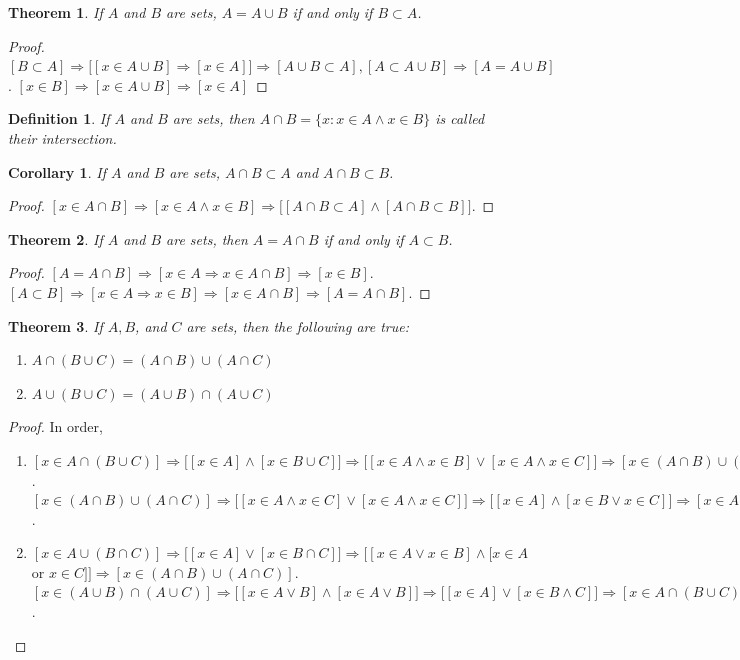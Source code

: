 \documentclass[oneside]{book}
\theoremstyle{mystyle}
\newtheorem{theorem}{Theorem}[section]
\newtheorem{definition}{Definition}[section]
\newtheorem{corollary}{Corollary}[section]
\begin{document}
\begin{theorem}
If $A$ and $B$ are sets, $A=A\cup B$ if and only if $B\subset A$.
\end{theorem}
\begin{proof}
$[B\subset A]\Rightarrow \big[[x\in A\cup B] \Rightarrow [x\in A]\big]\Rightarrow[A\cup B \subset A], [A\subset A\cup B]\Rightarrow[A=A\cup B]$. $[x\in B] \Rightarrow [x\in A\cup B]\Rightarrow [x\in A]$
\end{proof}

\begin{definition}
If $A$ and $B$ are sets, then $A\cap B = \{x:x\in A \land x\in B\}$ is called their intersection.
\end{definition}

\begin{corollary}
If $A$ and $B$ are sets, $A\cap B \subset A$ and $A\cap B \subset B$.
\end{corollary}
\begin{proof}
$[x\in A\cap B]\Rightarrow [x\in A\land x\in B]\Rightarrow \big[[A\cap B \subset A]\land [A\cap B \subset B]\big]$.
\end{proof}

\begin{theorem}
If $A$ and $B$ are sets, then $A=A\cap B$ if and only if $A\subset B$.
\end{theorem}
\begin{proof}
$[A=A\cap B]\Rightarrow [x\in A\Rightarrow x\in A \cap B]\Rightarrow [x\in B]$. $[A\subset B]\Rightarrow [x\in A\Rightarrow x\in B]\Rightarrow [x\in A\cap B]\Rightarrow [A=A\cap B]$.
\end{proof}

\begin{theorem}
If $A,B$, and $C$ are sets, then the following are true:
\begin{enumerate}
\item $A\cap (B\cup C) = (A\cap B)\cup (A\cap C)$
\item $A\cup (B\cup C) = (A\cup B)\cap (A\cup C)$
\end{enumerate}
\end{theorem}
\begin{proof}
In order,
\begin{enumerate}
\item $[x\in A\cap (B\cup C)]\Rightarrow \big[[x\in A] \land [x\in B\cup C]\big]\Rightarrow \big[[x\in A\land x\in B]\lor [x\in A\land x\in C]\big]\Rightarrow [x\in (A\cap B)\cup (A\cap C)]$. $[x\in (A\cap B)\cup(A\cap C)]\Rightarrow \big[[x\in A\land x\in C]\lor [x\in A \land x\in C]\big]\Rightarrow \big[[x\in A]\land [x\in B\lor x\in C]\big]\Rightarrow [x\in A\cap(B\cup C)]$.
\item $[x\in A\cup (B\cap C)]\Rightarrow \big[[x\in A]\lor [x\in B\cap C]\big] \Rightarrow \big[[x\in A \lor x\in B]\land [x\in A$ or $x\in C]\big]\Rightarrow [x\in (A\cap B)\cup (A\cap C)]$. $[x\in (A\cup B)\cap (A\cup C)]\Rightarrow \big[[x\in A\lor B]\land [x\in A\lor B]\big]\Rightarrow \big[[x\in A]\lor[x\in B\land C]\big]\Rightarrow [x\in A\cap(B\cup C)]$.
\end{enumerate}
\end{proof}
\end{document}
